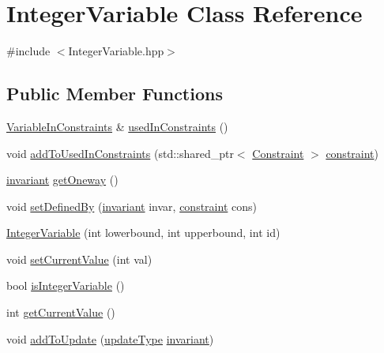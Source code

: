 \hypertarget{class_integer_variable}{\section{Integer\-Variable Class Reference}
\label{class_integer_variable}
}


{\ttfamily \#include $<$Integer\-Variable.\-hpp$>$}

\subsection*{Public Member Functions}
\begin{DoxyCompactItemize}
\item 
\hyperlink{_constants_8hpp_a02baa5ed1a26d5d8a8c4adb2d0e59a57}{Variable\-In\-Constraints} \& \hyperlink{class_integer_variable_a5e9776b7de2cecf0c68a321908996240}{used\-In\-Constraints} ()
\item 
void \hyperlink{class_integer_variable_ac7d3b8458189707ec2bc30ed8223d476}{add\-To\-Used\-In\-Constraints} (std\-::shared\-\_\-ptr$<$ \hyperlink{class_constraint}{Constraint} $>$ \hyperlink{_constants_8hpp_ab3a9f5ca3242dd173f530bb9f68fc611}{constraint})
\item 
\hyperlink{_constants_8hpp_ac9b562f250a09412c017b68185321eba}{invariant} \hyperlink{class_integer_variable_a397ba35a4bae5508d4d44e164d02c2ac}{get\-Oneway} ()
\item 
void \hyperlink{class_integer_variable_abdaa77cb4582cf6db133ffb1a1cf839d}{set\-Defined\-By} (\hyperlink{_constants_8hpp_ac9b562f250a09412c017b68185321eba}{invariant} invar, \hyperlink{_constants_8hpp_ab3a9f5ca3242dd173f530bb9f68fc611}{constraint} cons)
\item 
\hyperlink{class_integer_variable_ae04ab8d89dbffd42c7bba04f0db31456}{Integer\-Variable} (int lowerbound, int upperbound, int id)
\item 
void \hyperlink{class_integer_variable_a6a1823e3601a6375b55b5cfc3112179d}{set\-Current\-Value} (int val)
\item 
bool \hyperlink{class_integer_variable_a773c5fa99af9215ba9a56f97ea25ed80}{is\-Integer\-Variable} ()
\item 
int \hyperlink{class_integer_variable_a31c31e2a2950e3a9f3cfd46c59485414}{get\-Current\-Value} ()
\item 
void \hyperlink{class_integer_variable_aad10aa4509149b887c26133af7f04fa0}{add\-To\-Update} (\hyperlink{_constants_8hpp_a1c0fa2df7430fc28b51f047f98434f6c}{update\-Type} \hyperlink{_constants_8hpp_ac9b562f250a09412c017b68185321eba}{invariant})

\end{DoxyCompactItemize}
